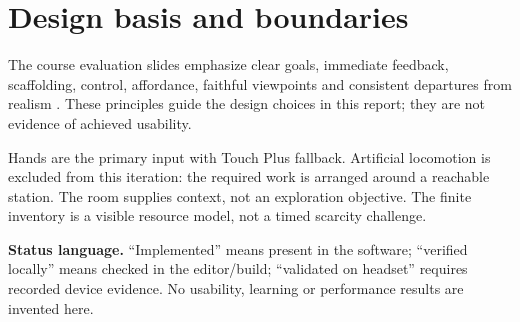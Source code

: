 \section*{Design basis and boundaries}
The course evaluation slides emphasize clear goals, immediate feedback, scaffolding, control, affordance, faithful viewpoints and consistent departures from realism \cite{gain}. These principles guide the design choices in this report; they are not evidence of achieved usability.

Hands are the primary input with Touch Plus fallback. Artificial locomotion is excluded from this iteration: the required work is arranged around a reachable station. The room supplies context, not an exploration objective. The finite inventory is a visible resource model, not a timed scarcity challenge.

\textbf{Status language.} ``Implemented'' means present in the software; ``verified locally'' means checked in the editor/build; ``validated on headset'' requires recorded device evidence. No usability, learning or performance results are invented here.
